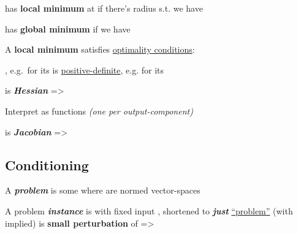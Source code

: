 \hSep %

 has \textbf{local minimum} at  if there's radius 
s.t.  we have 

 has \textbf{global minimum}  if 
we have 

A \textbf{local minimum} satisfies \ul{optimality conditions}:
\begin{itemize}
      \vItem
            , e.g.~for 
            its 
      \vItem
             is \ul{positive-definite},
            e.g. for  its 
\end{itemize}

\hSep %

 is \textbf{\emph{Hessian}} =>

Interpret  as  functions 
\emph{(one per output-component)}
\begin{itemize}
      \vItem
            is \textbf{\emph{Jacobian}} =>
\end{itemize}


\subsection*{Conditioning}

A \textbf{\emph{problem}} is some  where 
are normed vector-spaces

\begin{itemize}

      \vItem
            A problem \textbf{\emph{instance}} is  with fixed input
            , shortened to \textbf{\emph{just}} \ul{``problem''}
            (with  implied)
      \vItem
             is \textbf{small perturbation} of 
            => 
\end{itemize}

